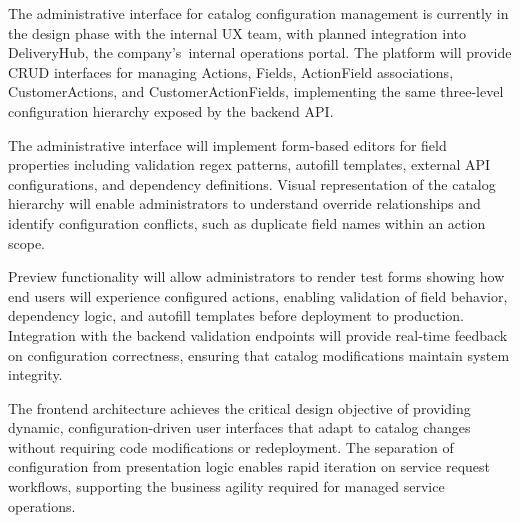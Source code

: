 The administrative interface for catalog configuration management is currently in the design phase with the internal UX team, with planned integration into DeliveryHub, the company's~internal operations portal. The platform will provide CRUD interfaces for managing Actions, Fields, ActionField associations, CustomerActions, and CustomerActionFields, implementing the same three-level configuration hierarchy exposed by the backend API.

The administrative interface will implement form-based editors for field properties including validation regex patterns, autofill templates, external API configurations, and dependency definitions. Visual representation of the catalog hierarchy will enable administrators to understand override relationships and identify configuration conflicts, such as duplicate field names within an action scope.

Preview functionality will allow administrators to render test forms showing how end users will experience configured actions, enabling validation of field behavior, dependency logic, and autofill templates before deployment to production. Integration with the backend validation endpoints will provide real-time feedback on configuration correctness, ensuring that catalog modifications maintain system integrity.

The frontend architecture achieves the critical design objective of providing dynamic, configuration-driven user interfaces that adapt to catalog changes without requiring code modifications or redeployment. The separation of configuration from presentation logic enables rapid iteration on service request workflows, supporting the business agility required for managed service operations.

